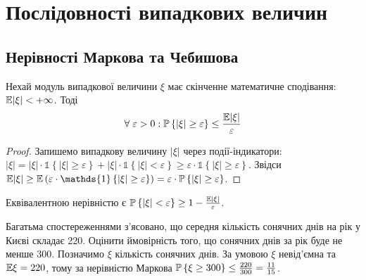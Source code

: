 \section{Послідовності випадкових величин}
\subsection{Нерівності Маркова та Чебишова}
\begin{proposition*}
    Нехай модуль випадкової величини $\xi$ має скінченне математичне сподівання: $\E|\xi| < +\infty$.
    Тоді 
    \begin{gather}\label{Markov_ineq}
        \forall \; \varepsilon >0 : \P\left\{ |\xi| \geq \varepsilon\right\} \leq \frac{\E|\xi|}{\varepsilon}
    \end{gather}
\end{proposition*}
\begin{proof}
    Запишемо випадкову величину $|\xi|$ через події-індикатори: 
    $|\xi| = |\xi|\cdot \mathds{1}\left\{|\xi| \geq \varepsilon\right\} + |\xi|\cdot \mathds{1}\left\{|\xi| < \varepsilon\right\} \geq
    \varepsilon\cdot \mathds{1}\left\{|\xi| \geq \varepsilon\right\}$. Звідси $\E|\xi| \geq \E \left( \varepsilon\cdot \mathds{1}\left\{|\xi| \geq \varepsilon\right\}\right) =
    \varepsilon \cdot \P\left\{ |\xi| \geq \varepsilon\right\}$.
\end{proof}
\begin{remark}
    Еквівалентною нерівністю є $\P\left\{ |\xi| < \varepsilon\right\} \geq 1 - \frac{\E|\xi|}{\varepsilon}$.
\end{remark}

\begin{example}
    Багатьма спостереженнями з'ясовано, що середня кількість
    сонячних днів на рік у Києві складає 220. Оцінити ймовірність того, що
    сонячних днів за рік буде не менше 300. Позначимо $\xi$ кількість сонячних днів. За умовою $\xi$ невід'ємна та $\E\xi = 220$,
    тому за нерівністю Маркова $\P\left\{ \xi \geq 300\right\} \leq \frac{220}{300} = \frac{11}{15}$.
\end{example}

